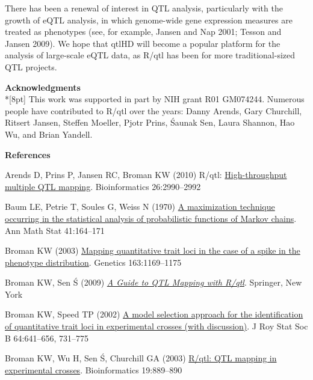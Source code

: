 \documentclass[letterpaper]{article}
\newenvironment{hanging}
{\begin{list}{}
        {\setlength{\labelwidth}{0in}
         \setlength{\leftmargin}{1em}
         \setlength{\itemindent}{-1em}
         \setlength{\parsep}{0in}
         \setlength{\itemsep}{0in}
        }
}
{\end{list}}
\begin{document}
\begin{multicols}{2}
There has been a renewal of interest in QTL analysis, particularly
with the growth of eQTL analysis, in which genome-wide gene expression
measures are treated as phenotypes (see, for example, Jansen and Nap
2001; Tesson and Jansen 2009).  We hope that qtlHD will become
a popular platform for the analysis of large-scale eQTL data, as R/qtl
has been for more traditional-sized QTL projects.

\bigskip
{}
\noindent \textbf{\sffamily Acknowledgments} \\*[8pt]
This work was supported in part by NIH grant R01 GM074244.  Numerous
people have contributed to R/qtl over the years: Danny Arends, Gary
Churchill, Ritsert Jansen, Steffen Moeller, Pjotr Prins, \'Saunak Sen,
Laura Shannon, Hao Wu, and Brian Yandell.



\bigskip
{}
\noindent \textbf{\sffamily References}
\begin{hanging}

\item Arends D, Prins P, Jansen RC, Broman KW (2010) R/qtl:
  \href{http://www.ncbi.nlm.nih.gov/pubmed/20966004}{High-throughput
    multiple QTL mapping}. Bioinformatics 26:2990--2992

\item Baum LE, Petrie T, Soules G, Weiss N (1970)
  \href{http://projecteuclid.org/euclid.aoms/1177697196}{A
    maximization technique occurring in the statistical analysis of
    probabilistic functions of Markov chains}. Ann Math Stat
  41:164--171

\item Broman KW (2003)
  \href{http://www.ncbi.nlm.nih.gov/pubmed/12663553}{Mapping
    quantitative trait loci in the case of a spike in the phenotype
    distribution}. Genetics 163:1169--1175

\item Broman KW, Sen \'S (2009) \href{http://www.rqtl.org/book}{\emph{A
  Guide to QTL Mapping with R/qtl}}. Springer, New York

\item Broman KW, Speed TP (2002)
  \href{http://dx.doi.org/10.1111/1467-9868.00354}{A model selection
    approach for the identification of quantitative trait loci in
    experimental crosses (with discussion)}. J Roy Stat Soc B
  64:641--656, 731--775

\item Broman KW, Wu H, Sen \'S, Churchill GA (2003)
  \href{http://www.ncbi.nlm.nih.gov/pubmed/12724300}{R/qtl: QTL
    mapping in experimental crosses}. Bioinformatics 19:889--890


\end{hanging}
\end{multicols}
\end{document}

